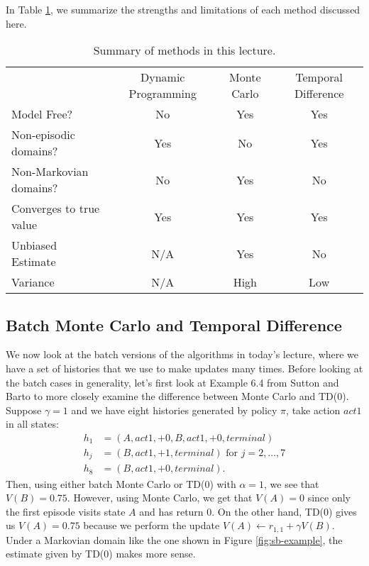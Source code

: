 \documentclass{article}
\begin{document}
In Table \ref{tab:summary}, we summarize the strengths and limitations of each method discussed here.

\begin{table}[]
\centering
\begin{tabular}{lccc}
                        & Dynamic Programming & Monte Carlo & Temporal Difference \\
Model Free?             & No                  & Yes         & Yes                 \\
Non-episodic domains?   & Yes                 & No          & Yes                 \\
Non-Markovian domains?  & No                  & Yes         & No                  \\
Converges to true value & Yes                 & Yes         & Yes                 \\
Unbiased Estimate       & N/A                 & Yes         & No 		\\
Variance	                	& N/A                 & High         & Low              \\
\end{tabular}
\caption{Summary of methods in this lecture.}\label{tab:summary}
\end{table}

\subsection{Batch Monte Carlo and Temporal Difference}

We now look at the batch versions of the algorithms in today's lecture, where we have a set of histories that we use to make updates many times.  Before looking at the batch cases in generality, let's first look at Example 6.4 from Sutton and Barto \cite{sb18} to more closely examine the difference between Monte Carlo and TD(0).  Suppose $\gamma = 1$ and we have eight histories generated by policy $\pi$, take action $act1$ in all states:
\begin{align*}
h_{1} &= (A, act1, +0, B, act1, +0, terminal)\\
h_{j} &= (B, act1, +1, terminal) \text{ for $j = 2,\ldots, 7$} \\
h_{8} &= (B, act1, +0, terminal).
\end{align*}
Then, using either batch Monte Carlo or TD(0) with $\alpha = 1$, we see that $V(B) = 0.75$.  However, using Monte Carlo, we get that $V(A) = 0$ since only the first episode visits state $A$ and has return 0.  On the other hand, TD(0) gives us $V(A) = 0.75$ because we perform the update $V(A) \gets r_{1, 1} + \gamma V(B)$.  Under a Markovian domain like the one shown in Figure \ref{fig:sb-example}, the estimate given by TD(0) makes more sense.
\end{document}
